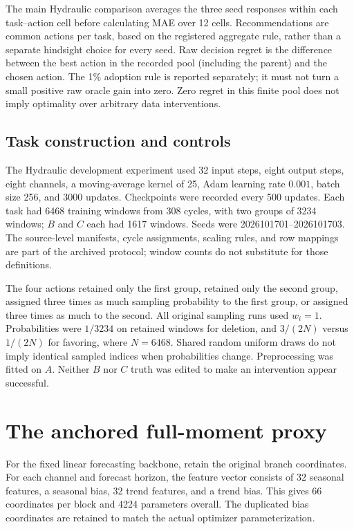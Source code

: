 \documentclass[11pt]{article}
\begin{document}
The main Hydraulic comparison averages the three seed responses within each task--action cell before calculating MAE over 12 cells. Recommendations are common actions per task, based on the registered aggregate rule, rather than a separate hindsight choice for every seed. Raw decision regret is the difference between the best action in the recorded pool (including the parent) and the chosen action. The 1\% adoption rule is reported separately; it must not turn a small positive raw oracle gain into zero. Zero regret in this finite pool does not imply optimality over arbitrary data interventions.

\subsection{Task construction and controls}
The Hydraulic development experiment used 32 input steps, eight output steps, eight channels, a moving-average kernel of 25, Adam learning rate $0.001$, batch size 256, and 3000 updates. Checkpoints were recorded every 500 updates. Each task had 6468 training windows from 308 cycles, with two groups of 3234 windows; $B$ and $C$ each had 1617 windows. Seeds were 2026101701--2026101703. The source-level manifests, cycle assignments, scaling rules, and row mappings are part of the archived protocol; window counts do not substitute for those definitions.

The four actions retained only the first group, retained only the second group, assigned three times as much sampling probability to the first group, or assigned three times as much to the second. All original sampling runs used $w_i=1$. Probabilities were $1/3234$ on retained windows for deletion, and $3/(2N)$ versus $1/(2N)$ for favoring, where $N=6468$. Shared random uniform draws do not imply identical sampled indices when probabilities change. Preprocessing was fitted on $A$. Neither $B$ nor $C$ truth was edited to make an intervention appear successful.

\section{The anchored full-moment proxy}
For the fixed linear forecasting backbone, retain the original branch coordinates. For each channel and forecast horizon, the feature vector consists of 32 seasonal features, a seasonal bias, 32 trend features, and a trend bias. This gives 66 coordinates per block and 4224 parameters overall. The duplicated bias coordinates are retained to match the actual optimizer parameterization.
\end{document}
